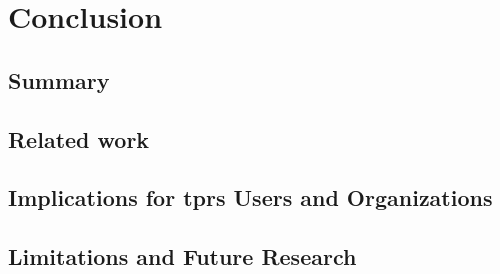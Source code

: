
\newpage
\section{Conclusion}


\subsection{Summary}


\subsection{Related work}


\subsection{Implications for \ac{tprs} Users and Organizations}


\subsection{Limitations and Future Research}

